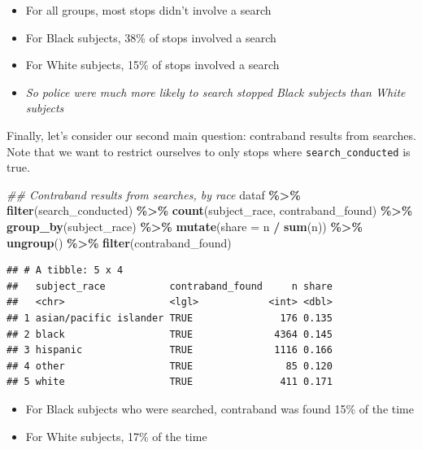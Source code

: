 \documentclass[
]{article}
\newenvironment{Shaded}{\begin{snugshade}}{\end{snugshade}}
\newcommand{\CommentTok}[1]{\textcolor[rgb]{0.56,0.35,0.01}{\textit{#1}}}
\newcommand{\DataTypeTok}[1]{\textcolor[rgb]{0.13,0.29,0.53}{#1}}
\newcommand{\KeywordTok}[1]{\textcolor[rgb]{0.13,0.29,0.53}{\textbf{#1}}}
\newcommand{\NormalTok}[1]{#1}
\newcommand{\OperatorTok}[1]{\textcolor[rgb]{0.81,0.36,0.00}{\textbf{#1}}}
\newcommand{\StringTok}[1]{\textcolor[rgb]{0.31,0.60,0.02}{#1}}
\providecommand{\tightlist}{%
  \setlength{\itemsep}{0pt}\setlength{\parskip}{0pt}}
\begin{document}
\begin{itemize}
\item
  For all groups, most stops didn't involve a search
\item
  For Black subjects, 38\% of stops involved a search
\item
  For White subjects, 15\% of stops involved a search
\item
  \emph{So police were much more likely to search stopped Black subjects than White subjects}
\end{itemize}

Finally, let's consider our second main question: contraband results from searches. Note that we want to restrict ourselves to only stops where \texttt{search\_conducted} is true.

\begin{Shaded}
\begin{Highlighting}[]
\CommentTok{\#\# Contraband results from searches, by race}
\NormalTok{dataf }\OperatorTok{\%\textgreater{}\%}\StringTok{ }
\StringTok{    }\KeywordTok{filter}\NormalTok{(search\_conducted) }\OperatorTok{\%\textgreater{}\%}\StringTok{ }
\StringTok{    }\KeywordTok{count}\NormalTok{(subject\_race, contraband\_found) }\OperatorTok{\%\textgreater{}\%}\StringTok{ }
\StringTok{    }\KeywordTok{group\_by}\NormalTok{(subject\_race) }\OperatorTok{\%\textgreater{}\%}\StringTok{ }
\StringTok{    }\KeywordTok{mutate}\NormalTok{(}\DataTypeTok{share =}\NormalTok{ n }\OperatorTok{/}\StringTok{ }\KeywordTok{sum}\NormalTok{(n)) }\OperatorTok{\%\textgreater{}\%}\StringTok{ }
\StringTok{    }\KeywordTok{ungroup}\NormalTok{() }\OperatorTok{\%\textgreater{}\%}\StringTok{ }
\StringTok{    }\KeywordTok{filter}\NormalTok{(contraband\_found)}
\end{Highlighting}
\end{Shaded}

\begin{verbatim}
## # A tibble: 5 x 4
##   subject_race           contraband_found     n share
##   <chr>                  <lgl>            <int> <dbl>
## 1 asian/pacific islander TRUE               176 0.135
## 2 black                  TRUE              4364 0.145
## 3 hispanic               TRUE              1116 0.166
## 4 other                  TRUE                85 0.120
## 5 white                  TRUE               411 0.171
\end{verbatim}

\begin{itemize}
\tightlist
\item
  For Black subjects who were searched, contraband was found 15\% of the time
\item
  For White subjects, 17\% of the time
\end{itemize}
\end{document}
